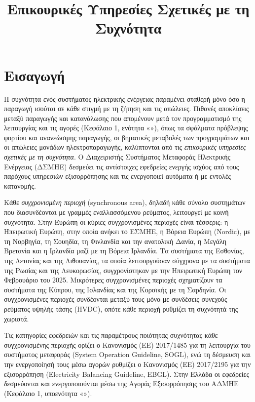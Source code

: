 \title{Επικουρικές Υπηρεσίες Σχετικές με τη Συχνότητα}

\section{Εισαγωγή}
\label{kef-03-theoria}

Η συχνότητα ενός συστήματος ηλεκτρικής ενέργειας παραμένει σταθερή μόνο όσο η παραγωγή ισούται
σε κάθε στιγμή με τη ζήτηση και τις απώλειες. Πιθανές αποκλίσεις μεταξύ παραγωγής και κατανάλωσης που απομένουν μετά τον
προγραμματισμό της λειτουργίας και τις αγορές (Κεφάλαιο 1, ενότητα «»),
όπως τα σφάλματα πρόβλεψης φορτίου και ανανεώσιμης παραγωγής, οι βηματικές μεταβολές των
προγραμμάτων και οι απώλειες μονάδων ηλεκτροπαραγωγής, καλύπτονται από τις \emph{επικουρικές
υπηρεσίες σχετικές με τη συχνότητα}. Ο Διαχειριστής Συστήματος Μεταφοράς Ηλεκτρικής
Ενέργειας (ΔΣΜΗΕ) δεσμεύει τις
αντίστοιχες εφεδρείες ενεργής ισχύος από τους παρόχους υπηρεσιών εξισορρόπησης και τις
ενεργοποιεί αυτόματα ή με εντολές κατανομής.

Κάθε \emph{συγχρονισμένη περιοχή} (synchronous area), δηλαδή κάθε σύνολο συστημάτων που
διασυνδέονται με γραμμές εναλλασσόμενου ρεύματος, λειτουργεί με κοινή συχνότητα. Στην Ευρώπη οι
κύριες συγχρονισμένες περιοχές είναι τέσσερις: η Ηπειρωτική Ευρώπη, στην οποία ανήκει το
ΕΣΜΗΕ, η Βόρεια Ευρώπη (Nordic), με τη Νορβηγία, τη Σουηδία, τη Φινλανδία και την ανατολική
Δανία, η Μεγάλη Βρετανία και η Ιρλανδία μαζί με τη Βόρεια Ιρλανδία. Τα συστήματα της Εσθονίας,
της Λετονίας και της Λιθουανίας, τα οποία λειτουργούσαν σύγχρονα με τα συστήματα της Ρωσίας και
της Λευκορωσίας, συγχρονίστηκαν με την Ηπειρωτική Ευρώπη τον Φεβρουάριο του 2025. Μικρότερες
συγχρονισμένες περιοχές σχηματίζουν τα συστήματα της Κύπρου, της Ισλανδίας και της Κορσικής με
τη Σαρδηνία. Οι συγχρονισμένες περιοχές συνδέονται μεταξύ τους μόνο με συνδέσεις συνεχούς
ρεύματος υψηλής τάσης (HVDC), οπότε κάθε περιοχή ρυθμίζει τη συχνότητά της χωριστά.

Τις κατηγορίες εφεδρειών και τις παραμέτρους ποιότητας συχνότητας κάθε συγχρονισμένης περιοχής
ορίζει ο Κανονισμός (ΕΕ) 2017/1485 για τη λειτουργία του συστήματος μεταφοράς (System
Operation Guideline, SOGL), ενώ τη δέσμευση και την ενεργοποίησή τους μέσω αγορών ρυθμίζει ο
Κανονισμός (ΕΕ) 2017/2195 για την εξισορρόπηση (Electricity Balancing Guideline, EBGL). Στην
Ελλάδα οι εφεδρείες δεσμεύονται και ενεργοποιούνται μέσω της Αγοράς Εξισορρόπησης του ΑΔΜΗΕ
(Κεφάλαιο 1, υποενότητα «»).

